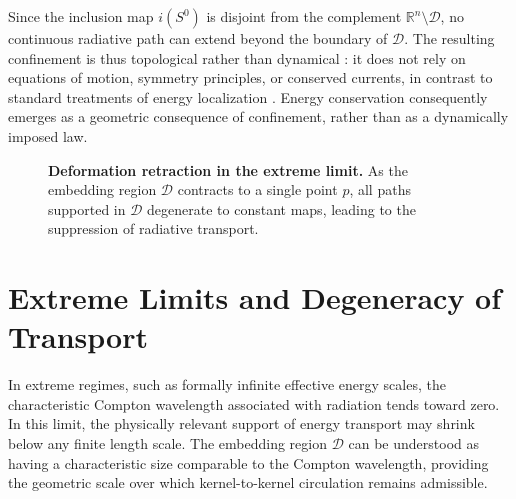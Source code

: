 \documentclass[%
 reprint,
 amsmath,amssymb,
 aps,
 prb,
]{revtex4-2}
\numberwithin{equation}{section}
\begin{document}
Since the inclusion map $i(S^{0})$ is disjoint from the complement $\mathbb{R}^{n}\setminus \mathcal{D}$, no continuous radiative path can extend beyond the boundary of $\mathcal{D}$.
The resulting confinement is thus topological rather than dynamical \cite{Geroch1970}: it does not rely on equations of motion, symmetry principles, or conserved currents, in contrast to standard treatments of energy localization \cite{Wald1984}.
Energy conservation consequently emerges as a geometric consequence of confinement, rather than as a dynamically imposed law.


\begin{figure}[t!]
\centering
{}
\caption{\justifying \textbf{Deformation retraction in the extreme limit.} As the embedding region $\mathcal{D}$ contracts to a single point $p$, all paths supported in $\mathcal{D}$ degenerate to constant maps, leading to the suppression of radiative transport.}
\label{fig:retraction}
\end{figure}


\section{Extreme Limits and Degeneracy of Transport}
\label{sec:extreme}

In extreme regimes, such as formally infinite effective energy scales, the characteristic Compton wavelength associated with radiation tends toward zero.
In this limit, the physically relevant support of energy transport may shrink below any finite length scale.
The embedding region $\mathcal{D}$ can be understood as having a characteristic size comparable to the Compton wavelength, providing the geometric scale over which kernel-to-kernel circulation remains admissible.
\end{document}
